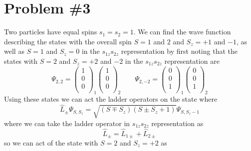 \documentclass[11pt]{article}
\numberwithin{equation}{section}
\begin{document}
\pagebreak

\section{Problem \#3}
Two particles have equal spins $s_1=s_2=1$. We can find the wave function describing the 
states with the overall spin $S=1$ and $2$ and $S_z=+1$ and $-1$, as well as $S=1$ and $S_z=0$
in the $s_{1z}s_{2z}$ representation by first noting that the states with $S=2$ and $S_z=+2$ 
and $-2$ in the $s_{1z}s_{2z}$ representation are
$$\Psi_{2,2} = \left(\begin{array}{c} 1\\ 0\\ 0\\\end{array}\right)_{1}\left(\begin{array}{c} 1\\ 0\\ 0\\\end{array}\right)_{2} \qquad
\Psi_{2,-2} = \left(\begin{array}{c} 0\\ 0\\ 1\\\end{array}\right)_{1}\left(\begin{array}{c} 0\\ 0\\ 1\\\end{array}\right)_{2} $$
Using these states we can act the ladder operators on the state where
$$\hat{L}_{\pm}\Psi_{S,S_z} = \sqrt{(S\mp{S_z})(S\pm{S_z}+1)}\Psi_{S,S_z-1}$$
where we can take the ladder operator in $s_{1z}s_{2z}$ representation as
$$\hat{L}_{\pm} = \hat{L}_{1\pm}+\hat{L}_{2\pm}$$
so we can act of the state with $S=2$ and $S_z=+2$ as
\end{document}

